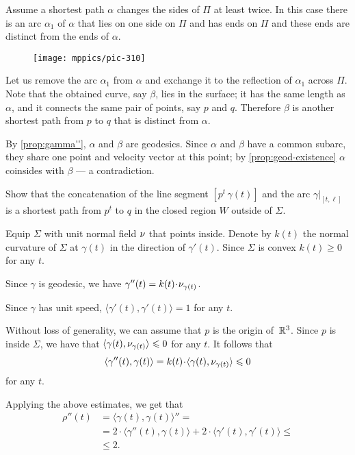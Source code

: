 Assume a shortest path $\alpha$ changes the sides of $\Pi$ at least twice.
In this case there is an arc $\alpha_1$ of $\alpha$ that lies on one side on $\Pi$ and has ends on $\Pi$ and these ends are distinct from the ends of $\alpha$.

\begin{wrapfigure}{r}{38 mm}
\vskip-0mm
\centering
\texttt{[image: mppics/pic-310]}
\vskip0mm
\end{wrapfigure}

Let us remove the arc $\alpha_1$ from $\alpha$ and exchange it to the reflection of $\alpha_1$ across $\Pi$.
Note that the obtained curve, say $\beta$, lies in the surface; it has the same length as $\alpha$, and it connects the same pair of points, say $p$ and $q$.
Therefore $\beta$ is another shortest path from $p$ to $q$ that is distinct from $\alpha$.

By \ref{prop:gamma''}, $\alpha$ and $\beta$ are geodesics.
Since $\alpha$ and $\beta$ have a common subarc, they share one point and velocity vector at this point;
by \ref{prop:geod-existence} $\alpha$ coinsides with $\beta$ --- a contradiction.



 Show that the concatenation of the line segment $[p^t\,\gamma(t)]$ and the arc $\gamma|_{[t,\ell]}$ is a shortest path from $p^t$ to $q$ in the closed region $W$ outside of $\Sigma$.

Equip $\Sigma$ with unit normal field $\nu$ that points inside.
Denote by $k(t)$ the normal curvature of $\Sigma$ at $\gamma(t)$ in the direction of $\gamma'(t)$.
Since $\Sigma$ is convex $k(t)\ge 0$ for any $t$.

Since $\gamma$ is geodesic, we have $\gamma''(t)=k(t)\cdot\Norm_{\gamma(t)}$.

Since $\gamma$ has unit speed, $\langle\gamma'(t),\gamma'(t)\rangle=1$ for any $t$.

Without loss of generality, we can assume that $p$ is the origin of~$\mathbb{R}^3$.
Since $p$ is inside $\Sigma$, we have that $\langle\gamma(t),\nu_{\gamma(t)}\rangle\leqslant 0$ for any $t$.
It follows that 
\[\langle\gamma''(t),\gamma(t)\rangle=k(t)\cdot \langle\gamma(t),\Norm_{\gamma(t)}\rangle\le 0\]
for any $t$.

Applying the above estimates, we get that 
\begin{align*}
\rho''(t)
&=\langle\gamma(t),\gamma(t)\rangle''=
\\
&=2\cdot\langle\gamma''(t),\gamma(t)\rangle+2\cdot\langle\gamma'(t),\gamma'(t)\rangle\le 
\\
&\le 2.
\end{align*}


